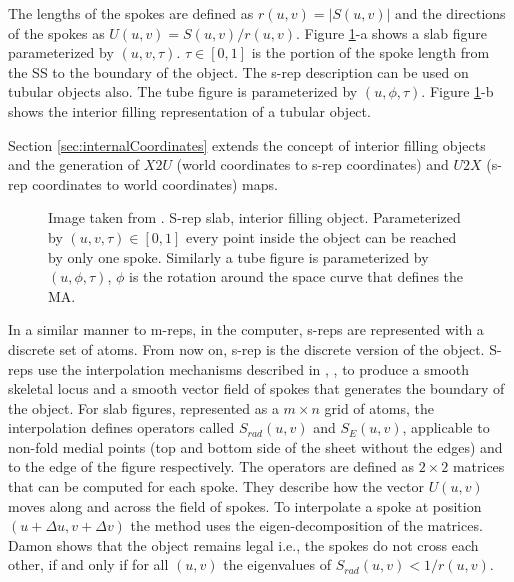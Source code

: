 The lengths of the spokes are defined as $r(u, v) = |S(u, v)|$ and 
the directions of the spokes as $U(u, v) = S(u, v)/r(u, v)$. 
Figure \ref{fig:srepFigure}-a shows a slab figure parameterized
by $(u, v, \tau)$. $\tau \in [0, 1]$ is the portion of the spoke length from the SS to the boundary of the object.
The s-rep description can be used on tubular objects also. 
The tube figure is parameterized by $(u, \phi, \tau)$. Figure \ref{fig:srepFigure}-b shows the 
interior filling representation of a tubular object.

Section \ref{sec:internalCoordinates} extends the concept of interior filling objects and
the generation of $X2U$ (world coordinates to s-rep coordinates) and $U2X$ (s-rep coordinates to world coordinates) maps. 

\begin{figure} 
 \centering  
 \caption[Slab type s-rep.]{Image taken from \cite{pizer_nested_2012}. S-rep slab, interior filling object. Parameterized by $(u, v, \tau) \in [0, 1]$
          every point inside the object can be reached by only one spoke. 
          Similarly a tube figure is parameterized by $(u, \phi, \tau)$, $\phi$ is the rotation around the space curve that defines the MA.}
 \label{fig:srepFigure}  
\end{figure}

In a similar manner to m-reps, in the computer, s-reps are represented with a discrete set of atoms. 
From now on, s-rep is the discrete version of the object. 
S-reps use the interpolation mechanisms described in \cite{damon2003smoothness},
\cite{han2006interpolation}, \cite{damon2008swept} to produce a smooth skeletal locus and a smooth vector field of spokes that generates the 
boundary of the object.
For slab figures, represented as a $m \times n$ grid of atoms, 
the interpolation defines operators called $S_{rad}(u, v)$ and $S_E(u, v)$, 
applicable to non-fold medial points (top and bottom side of the sheet without the edges) and to the edge of the figure respectively.
The operators are defined as $2 \times 2$ matrices that can be computed for each spoke. They describe how the vector
$U(u, v)$ moves along and across the field of spokes. To interpolate a spoke at position $(u + \Delta u, v + \Delta v)$ 
the method uses the eigen-decomposition of the matrices. Damon shows that the object remains legal i.e., the spokes
do not cross each other,
if and only if for all $(u, v)$ the eigenvalues of $S_{rad}(u, v) < 1/r(u,v)$. 


